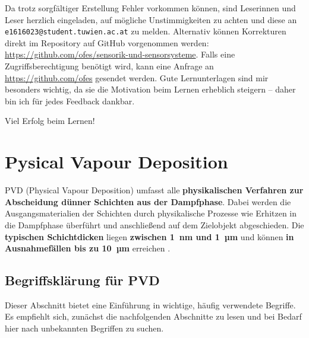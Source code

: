 \documentclass{article} %
\begin{document}
Da trotz sorgfältiger Erstellung Fehler vorkommen können, sind Leserinnen und Leser herzlich eingeladen, auf mögliche Unstimmigkeiten zu achten und diese an \texttt{e1616023@student.tuwien.ac.at} zu melden. Alternativ können Korrekturen direkt im Repository auf GitHub vorgenommen werden: \url{https://github.com/ofes/sensorik-und-sensorsysteme}. Falls eine Zugriffsberechtigung benötigt wird, kann eine Anfrage an \url{https://github.com/ofes} gesendet werden. Gute Lernunterlagen sind mir besonders wichtig, da sie die Motivation beim Lernen erheblich steigern – daher bin ich für jedes Feedback dankbar.

\vspace{1em}

Viel Erfolg beim Lernen!





\clearpage
\section{Pysical Vapour Deposition} %

PVD (Physical Vapour Deposition) umfasst alle \textbf{physikalischen Verfahren zur Abscheidung dünner Schichten aus der Dampfphase}. Dabei werden die Ausgangsmaterialien der Schichten durch physikalische Prozesse wie Erhitzen in die Dampfphase überführt und anschließend auf dem Zielobjekt abgeschieden. Die \textbf{typischen Schichtdicken} liegen \textbf{zwischen 1~nm und 1~µm} und können \textbf{in Ausnahmefällen bis zu 10~µm} erreichen \cite{keplinger2024}.





\vspace{1em}

\subsection{Begriffsklärung für PVD} %

Dieser Abschnitt bietet eine Einführung in wichtige, häufig verwendete Begriffe. Es empfiehlt sich, zunächst die nachfolgenden Abschnitte zu lesen und bei Bedarf hier nach unbekannten Begriffen zu suchen.
\end{document}
